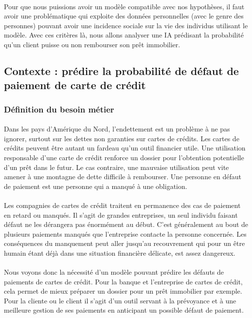 \documentclass[10pt, french, a4paper]{report}
\begin{document}
\paragraph{}
Pour que nous puissions avoir un modèle compatible avec nos hypothèses, il faut avoir une problématique qui exploite des données personnelles (avec le genre des personnes) pouvant avoir une incidence sociale sur la vie des individus utilisant le modèle. Avec ces critères là, nous allons analyser une IA prédisant la probabilité qu'un client puisse ou non rembourser son prêt immobilier.

\subsection{Contexte : prédire la probabilité de défaut de paiement de carte de crédit}

\subsubsection{Définition du besoin métier}

\paragraph{}
Dans les pays d'Amérique du Nord, l'endettement est un problème à ne pas ignorer, surtout sur les dettes non garanties sur cartes de crédits. Les cartes de crédits peuvent être autant un fardeau qu'un outil financier utile. Une utilisation responsable d'une carte de crédit renforce un dossier pour l'obtention potentielle d'un prêt dans le futur. Le cas contraire, une mauvaise utilisation peut vite amener à une montagne de dette difficile à rembourser. Une personne en défaut de paiement est une personne qui a manqué à une obligation. 

\paragraph{}
Les compagnies de cartes de crédit traitent en permanence des cas de paiement en retard ou manqués. Il s'agit de grandes entreprises, un seul individu faisant défaut ne les dérangera pas énormément au début. C'est généralement au bout de plusieurs paiements manqués que l'entreprise contacte la personne concernée. Les conséquences du manquement peut aller jusqu'au recouvrement qui pour un être humain étant déjà dans une situation financière délicate, est assez dangereux.

\paragraph{}
Nous voyons donc la nécessité d'un modèle pouvant prédire les défauts de paiements de cartes de crédit. Pour la banque et l'entreprise de cartes de crédit, cela permet de mieux préparer un dossier pour un prêt immobilier par exemple. Pour la cliente ou le client il s'agit d'un outil servant à la prévoyance et à une meilleure gestion de ses paiements en anticipant un possible défaut de paiement.
\end{document}
